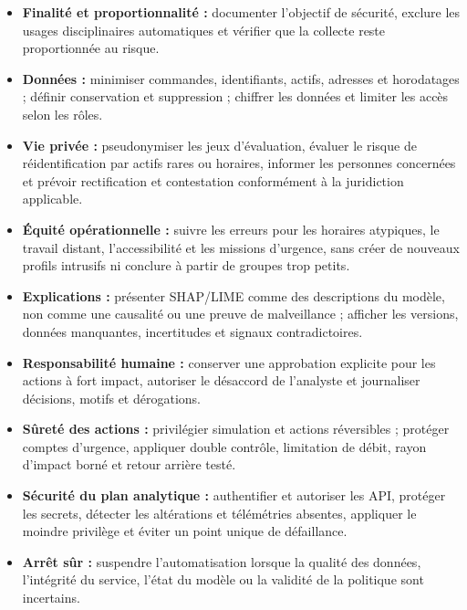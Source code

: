 \documentclass[11pt,a4paper,oneside]{report}
\theoremstyle{definition}
\theoremstyle{plain}
\begin{document}
\begin{itemize}[leftmargin=*]
  \item \textbf{Finalité et proportionnalité :} documenter l'objectif de
  sécurité, exclure les usages disciplinaires automatiques et vérifier que la
  collecte reste proportionnée au risque.

  \item \textbf{Données :} minimiser commandes, identifiants, actifs, adresses
  et horodatages ; définir conservation et suppression ; chiffrer les données
  et limiter les accès selon les rôles.

  \item \textbf{Vie privée :} pseudonymiser les jeux d'évaluation, évaluer le
  risque de réidentification par actifs rares ou horaires, informer les
  personnes concernées et prévoir rectification et contestation conformément à
  la juridiction applicable.

  \item \textbf{Équité opérationnelle :} suivre les erreurs pour les horaires
  atypiques, le travail distant, l'accessibilité et les missions d'urgence,
  sans créer de nouveaux profils intrusifs ni conclure à partir de groupes trop
  petits.

  \item \textbf{Explications :} présenter SHAP/LIME comme des descriptions du
  modèle, non comme une causalité ou une preuve de malveillance ; afficher les
  versions, données manquantes, incertitudes et signaux contradictoires.

  \item \textbf{Responsabilité humaine :} conserver une approbation explicite
  pour les actions à fort impact, autoriser le désaccord de l'analyste et
  journaliser décisions, motifs et dérogations.

  \item \textbf{Sûreté des actions :} privilégier simulation et actions
  réversibles ; protéger comptes d'urgence, appliquer double contrôle,
  limitation de débit, rayon d'impact borné et retour arrière testé.

  \item \textbf{Sécurité du plan analytique :} authentifier et autoriser les
  API, protéger les secrets, détecter les altérations et télémétries absentes,
  appliquer le moindre privilège et éviter un point unique de défaillance.

  \item \textbf{Arrêt sûr :} suspendre l'automatisation lorsque la qualité des
  données, l'intégrité du service, l'état du modèle ou la validité de la
  politique sont incertains.


\end{itemize}
\end{document}
